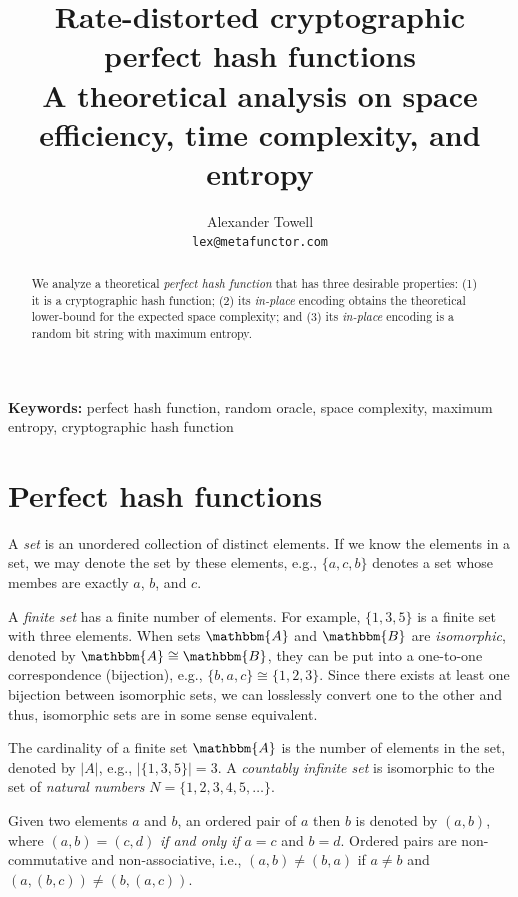 \documentclass[hidelinks,11pt,final]{article}
\title
{
    Rate-distorted cryptographic perfect hash functions\\
    \large A theoretical analysis on space efficiency, time complexity, and entropy
}
\author
{
    Alexander Towell\\
    \texttt{lex@metafunctor.com}
}
\date{}
\theoremstyle{plain}
\begin{document}
\maketitle
\begin{abstract}
We analyze a theoretical \emph{perfect hash function} that has three desirable properties: (1) it is a cryptographic hash function; (2) its \emph{in-place} encoding obtains the theoretical lower-bound for the expected space complexity; and (3) its \emph{in-place} encoding is a random bit string with maximum entropy.
\end{abstract}

\textbf{Keywords:} perfect hash function,
        random oracle, space complexity,
        maximum entropy, cryptographic hash function

\tableofcontents


\section{Perfect hash functions}
A \emph{set} is an unordered collection of distinct elements.
If we know the elements in a set, we may denote the set by these elements, e.g., $\{a,c,b\}$ denotes a set whose membes are exactly $a$, $b$, and $c$.

A \emph{finite set} has a finite number of elements.
For example, $\{ 1, 3, 5 \}$ is a finite set with three elements.
When sets $\mathbbm{A}$ and $\mathbbm{B}$ are \emph{isomorphic}, denoted by $\mathbbm{A} 
\cong \mathbbm{B}$, they can be put into a one-to-one correspondence (bijection), e.g., $\{b,a,c\} \cong \{1,2,3\}$.
Since there exists at least one bijection between isomorphic sets, we can losslessly convert one to the other and thus, isomorphic sets are in some sense equivalent.

The cardinality of a finite set $\mathbbm{A}$ is the number of elements in the set, denoted by $|A|$, e.g., $|\{ 1, 3, 5\}| = 3$.
A \emph{countably infinite set} is isomorphic to the set of \emph{natural numbers} $N = \{1,2,3,4,5,\ldots\}$.

Given two elements $a$ and $b$, an ordered pair of $a$ then $b$ is denoted by $(a,b)$, where $(a,b) = (c,d)$ \emph{if and only if} $a = c$ and $b = d$.
Ordered pairs are non-commutative and non-associative, i.e., $(a,b) \neq (b,a)$ if $a \neq b$ and $(a,(b,c)) \neq (b,(a,c))$.
\end{document}

